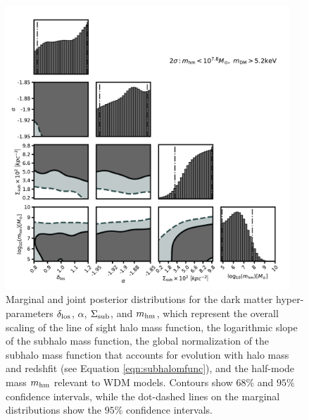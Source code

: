 \begin{figure}
	\includegraphics[clip,trim=0.2cm 0cm 0.5cm
	0.5cm,width=0.95\textwidth,keepaspectratio]{./figures_wdmchillsout/joint_inference.pdf}
	\caption{\label{fig:mainresult} Marginal and joint posterior distributions for the dark matter hyper-parameters $\delta_{\rm{los}}$, $\alpha$, $\Sigma_{\rm{sub}}$, and ${m_{\rm{hm}}}$, which represent the overall scaling of the line of sight halo mass function, the logarithmic slope of the subhalo mass function, the global normalization of the subhalo mass function that accounts for evolution with halo mass and redshfit (see Equation \ref{eqn:subhalomfunc}), and the half-mode mass ${m_{\rm{hm}}}$ relevant to WDM models. Contours show $68\%$ and $95\%$ confidence intervals, while the dot-dashed lines on the marginal distributions show the $95\%$ confidence intervals.}
\end{figure}	

